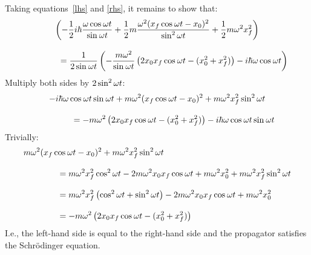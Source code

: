 \newpage
Taking equations~\ref{lhs} and \ref{rhs}, it remains to show that:
\begin{multline*}
  \left(
  -\half i\hbar \frac{\w\coswt}{\sinwt} +
  \half m \frac{\w^2(x_f \coswt - x_0)^2}{\sinwt[2]} +
  \half m\w ^2 x_f^2
  \right)
  \\[2ex]
  \qquad\qquad =
  \frac{1}{2\sinwt}
  \left(
  -\frac{m\w^2}{\sinwt}\left(2x_0 x_f\coswt - (x_0^2 + x_f^2)\right) -
  i\hbar\w\coswt
  \right)
\end{multline*}
Multiply both sides by $2\sinwt[2]$:
\begin{multline*}
  -i\hbar\w\coswt\sinwt +
  m \w^2(x_f \coswt - x_0)^2 +
  m\w ^2 x_f^2 \sinwt[2]
  \\[2ex]
  \qquad\qquad =
  -m\w^2\left(2x_0 x_f\coswt - (x_0^2 + x_f^2)\right) -
  i\hbar\w\coswt\sinwt
\end{multline*}
Trivially:
\begin{align*}
   & m \w^2(x_f \coswt - x_0)^2 +
  m\w ^2 x_f^2 \sinwt[2]
  \\[2ex]
   & \qquad\qquad =
  m\w^2 x_f^2\coswt[2] - 2m\w^2 x_0 x_f\coswt + m\w^2 x_0^2 +
  m\w ^2 x_f^2 \sinwt[2]
  \\[2ex]
   & \qquad\qquad =
  m\w^2 x_f^2\left(\coswt[2] + \sinwt[2]\right) - 2m\w^2 x_0 x_f\coswt + m\w^2 x_0^2
  \\[2ex]
   & \qquad\qquad =
  - m\w^2 \left(2x_0 x_f\coswt - (x_0^2 + x_f^2)\right)
\end{align*}
I.e., the left-hand side is equal to the right-hand side and the propagator
satisfies the Schr\"{o}dinger equation.
